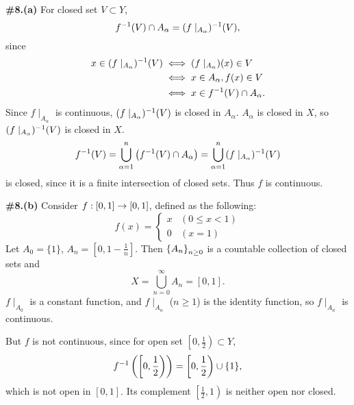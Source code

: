 \documentclass[a4paper,11pt]{article}
\begin{document}
\newpage

\phantom{?}
\vspace{5mm}

\begin{minipage}[t][270mm]{90mm}
    {\bfseries \large \#8.(a)} For closed set \(V \subset Y\),
    \[
        f^{-1}(V) \cap A_\alpha = (f \mid_{A_\alpha})^{-1}(V),
    \]
    since
    \[
        \begin{aligned}
            x \in (f \mid_{A_\alpha})^{-1}(V) & \iff (f \mid_{A_\alpha})(x) \in V  \\
                                             & \iff x \in A_\alpha, f(x) \in V    \\
                                             & \iff x \in f^{-1}(V) \cap A_\alpha.
        \end{aligned}
    \]
    Since \(f \mid_{A_\alpha}\) is continuous, \((f \mid_{A_\alpha})^{-1}(V)\) is closed in \(A_\alpha\). \(A_\alpha\) is closed in \(X\), so \((f \mid_{A_\alpha})^{-1}(V)\) is closed in \(X\).
    \[
        f^{-1}(V) = \bigcup_{\alpha = 1}^n \left( f^{-1}(V) \cap A_\alpha \right) = \bigcup_{\alpha = 1}^n (f \mid_{A_\alpha})^{-1}(V)
    \]
    is closed, since it is a finite intersection of closed sets. Thus \(f\) is continuous.
\end{minipage}
{\color{gray}\vline}
\begin{minipage}[t][270mm]{90mm}
    \phantom{?} {\bfseries \large \#8.(b)} Consider \(f: [0, 1] \rightarrow [0, 1]\), defined as the following:
    \[
        f(x) = \begin{cases}
            x & (0 \leq x < 1) \\ 0 & (x = 1)
        \end{cases}
    \]
    Let \(A_0 = \{1\}\), \(A_n = \left[0, 1 - \frac{1}{n}\right]\). Then \(\left\{ A_n \right\}_{n\geq 0}\) is a countable collection of closed sets and
    \[
        X = \bigcup_{n=0}^\infty A_n = [0, 1].
    \]
    \(f \mid_{A_0}\) is a constant function, and \(f \mid_{A_n}\) (\(n \geq 1\)) is the identity function, so \(f \mid_{A_n}\) is continuous.

    \bigskip

    But \(f\) is not continuous, since for open set \(\left[0, \frac{1}{2}\right) \subset Y\),
    \[
        f^{-1}\left( \left[0, \frac{1}{2}\right) \right) = \left[0, \frac{1}{2}\right) \cup \{1\},
    \]
    which is not open in \([0, 1]\). Its complement \(\left[\frac{1}{2}, 1\right)\) is neither open nor closed.
\end{minipage}
\end{document}

